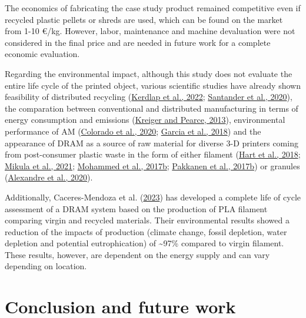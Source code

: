 \documentclass[
  12pt,
]{article}
\begin{document}
The economics of fabricating the case study product remained competitive
even if recycled plastic pellets or shreds are used, which can be found
on the market from 1-10 €/kg. However, labor, maintenance and machine
devaluation were not considered in the final price and are needed in
future work for a complete economic evaluation.

Regarding the environmental impact, although this study does not
evaluate the entire life cycle of the printed object, various scientific
studies have already shown feasibility of distributed recycling
(\protect\hyperlink{ref-kerdlap2022}{Kerdlap et al., 2022};
\protect\hyperlink{ref-santander2020}{Santander et al., 2020}), the
comparation between conventional and distributed manufacturing in terms
of energy consumption and emissions
(\protect\hyperlink{ref-Kreiger2013}{Kreiger and Pearce, 2013}),
environmental performance of AM
(\protect\hyperlink{ref-colorado2020a}{Colorado et al., 2020};
\protect\hyperlink{ref-garcia2018}{Garcia et al., 2018}) and the
appearance of DRAM as a source of raw material for diverse 3-D printers
coming from post-consumer plastic waste in the form of either filament
(\protect\hyperlink{ref-hart2018}{Hart et al., 2018};
\protect\hyperlink{ref-mikula2021}{Mikula et al., 2021};
\protect\hyperlink{ref-mohammed2017a}{Mohammed et al., 2017b};
\protect\hyperlink{ref-pakkanen2017}{Pakkanen et al., 2017b}) or
granules (\protect\hyperlink{ref-alexandre2020}{Alexandre et al.,
2020}).

Additionally, Caceres-Mendoza et al.
(\protect\hyperlink{ref-caceres-mendoza2023}{2023}) has developed a
complete life of cycle assessment of a DRAM system based on the
production of PLA filament comparing virgin and recycled materials.
Their environmental results showed a reduction of the impacts of
production (climate change, fossil depletion, water depletion and
potential eutrophication) of \textasciitilde97\% compared to virgin
filament. These results, however, are dependent on the energy supply and
can vary depending on location.

\hypertarget{conclusion-and-future-work}{%
\section{Conclusion and future work}\label{conclusion-and-future-work}}
\end{document}
